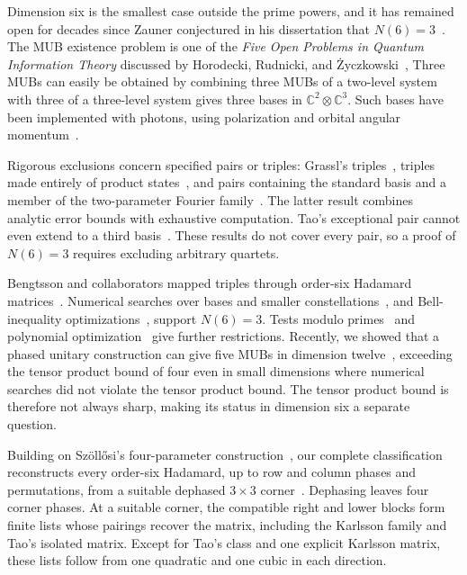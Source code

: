 Dimension six is the smallest case outside the prime powers, and it has remained open for decades since Zauner conjectured in his dissertation that $N(6)=3$~\cite{Zauner1999}. The MUB existence problem is one of the \emph{Five Open Problems in Quantum Information Theory} discussed by Horodecki, Rudnicki, and \.{Z}yczkowski~\cite{HorodeckiRudnickiZyczkowski2022},  
Three MUBs can easily be obtained by combining three MUBs of a two-level system with three of a three-level system gives three bases in $\mathbb C^2\otimes\mathbb C^3$. Such bases have been implemented with photons, using polarization and orbital angular momentum~\cite{DAmbrosio2013}. 

Rigorous exclusions concern specified pairs or triples: Grassl's triples~\cite{Grassl2004}, triples made entirely of product states~\cite{McNultyWeigert2012Triples}, and pairs containing the standard basis and a member of the two-parameter Fourier family~\cite{Jaming2009}. The latter result combines analytic error bounds with exhaustive computation. Tao's exceptional pair cannot even extend to a third basis~\cite{BrierleyWeigert2009}. These results do not cover every pair, so a proof of $N(6)=3$ requires excluding arbitrary quartets. 


Bengtsson and collaborators mapped triples through order-six Hadamard matrices~\cite{BengtssonEtAl2007}. Numerical searches over bases and smaller constellations~\cite{ButterleyHall2007,BrierleyWeigert2008}, and Bell-inequality optimizations~\cite{PratColomer2022}, support $N(6)=3$. Tests modulo primes~\cite{McConnell2021} and polynomial optimization~\cite{Mortimer2023} give further restrictions. Recently, we showed that a phased unitary construction can give five MUBs in dimension twelve~\cite{wuttig2026mutuallyunbiasedbases}, exceeding the tensor product bound of four even in small dimensions where numerical searches \mcw{[CITE]} did not violate the tensor product bound. The tensor product bound is therefore not always sharp, making its status in dimension six a separate question.

Building on Sz\"oll\H{o}si's four-parameter construction~\cite{Szollosi2012FourParameter}, our complete classification reconstructs every order-six Hadamard, up to row and column phases and permutations, from a suitable dephased $3\times3$ corner~\cite{wuttig2026completeclassificationcomplexhadamard}. Dephasing leaves four corner phases. At a suitable corner, the compatible right and lower blocks form finite lists whose pairings recover the matrix, including the Karlsson family and Tao's isolated matrix. Except for Tao's class and one explicit Karlsson matrix, these lists follow from one quadratic and one cubic in each direction.

